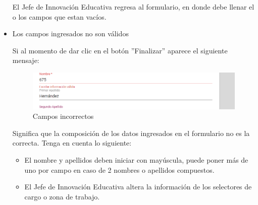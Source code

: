 \begin{itemize}
\begin{figure}[H]
                         \end{figure}

                           El Jefe de Innovación Educativa regresa al formulario, en donde debe llenar el o los campos que estan vacíos.

                        \item Los campos ingresados no son válidos

                            Si al momento de dar clic en el botón ''Finalizar'' aparece el siguiente mensaje:
                            \clearpage
                                \begin{figure}[H]
                            \centering
                            \includegraphics[width=0.4\linewidth]{images/SP1/MSG35}
                            \caption{Campos incorrectos}
                            \label{mensaje35}

                         \end{figure}


                            Significa que la composición de los datos ingresados en el formulario no es la correcta. Tenga en cuenta lo siguiente:

                            \begin{itemize}
                                \item El nombre y apellidos deben iniciar con mayúscula, puede poner más de uno por campo en caso de 2 nombres o apellidos compuestos.
                                \item El Jefe de Innovación Educativa altera la información de los selectores de cargo o zona de trabajo.
                            \end{itemize}



                    \end{itemize}